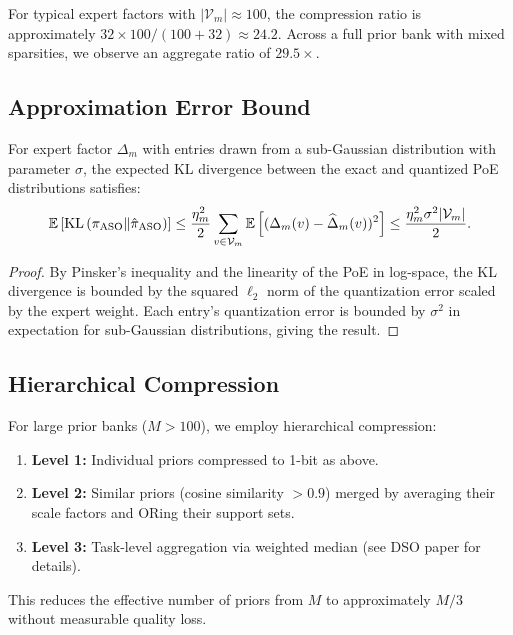 For typical expert factors with $|\mathcal{V}_m| \approx 100$, the compression
ratio is approximately $32 \times 100 / (100 + 32) \approx 24.2$. Across a full
prior bank with mixed sparsities, we observe an aggregate ratio of $29.5\times$.

\subsection{Approximation Error Bound}

\begin{lemma}
\label{lem:quant-error}
For expert factor $\Delta_m$ with entries drawn from a sub-Gaussian distribution
with parameter $\sigma$, the expected KL divergence between the exact and
quantized PoE distributions satisfies:
\begin{equation}
    \mathbb{E}\left[\operatorname{KL}\left(\pi_{\text{ASO}} \| \hat{\pi}_{\text{ASO}}\right)\right]
    \leq \frac{\eta_m^2}{2} \sum_{v \in \mathcal{V}_m}
    \mathbb{E}\left[(\Delta_m(v) - \widehat{\Delta}_m(v))^2\right]
    \leq \frac{\eta_m^2 \sigma^2 |\mathcal{V}_m|}{2}.
\end{equation}
\end{lemma}

\begin{proof}
By Pinsker's inequality and the linearity of the PoE in log-space, the KL
divergence is bounded by the squared $\ell_2$ norm of the quantization error
scaled by the expert weight. Each entry's quantization error is bounded by
$\sigma^2$ in expectation for sub-Gaussian distributions, giving the result.
\end{proof}

\subsection{Hierarchical Compression}

For large prior banks ($M > 100$), we employ hierarchical compression:
\begin{enumerate}[leftmargin=1.5em]
    \item \textbf{Level 1:} Individual priors compressed to 1-bit as above.
    \item \textbf{Level 2:} Similar priors (cosine similarity $> 0.9$) merged
          by averaging their scale factors and ORing their support sets.
    \item \textbf{Level 3:} Task-level aggregation via weighted median
          (see DSO paper for details).
\end{enumerate}

This reduces the effective number of priors from $M$ to approximately
$M / 3$ without measurable quality loss.

